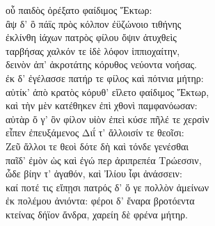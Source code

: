 \begin{Versi}[466]
\ladd{\ldots} οὗ παιδὸς ὀρέξατο φαίδιμος Ἕκτωρ:\\
ἂψ δ' ὃ πάϊς πρὸς κόλπον ἐϋζώνοιο τιθήνης\\
ἐκλίνθη ἰάχων πατρὸς φίλου ὄψιν ἀτυχθεὶς\\
ταρβήσας χαλκόν τε ἰδὲ λόφον ἱππιοχαίτην,\\
δεινὸν ἀπ' ἀκροτάτης κόρυθος νεύοντα νοήσας.\\
ἐκ δ' ἐγέλασσε πατήρ τε φίλος καὶ πότνια μήτηρ:\\
αὐτίκ' ἀπὸ κρατὸς κόρυθ' εἵλετο φαίδιμος Ἕκτωρ,\\
καὶ τὴν μὲν κατέθηκεν ἐπὶ χθονὶ παμφανόωσαν:\\
αὐτὰρ ὅ γ' ὃν φίλον υἱὸν ἐπεὶ κύσε πῆλέ τε χερσὶν\\
εἶπεν ἐπευξάμενος Διΐ τ' ἄλλοισίν τε θεοῖσι:\\
Ζεῦ ἄλλοι τε θεοὶ δότε δὴ καὶ τόνδε γενέσθαι\\
παῖδ' ἐμὸν ὡς καὶ ἐγώ περ ἀριπρεπέα Τρώεσσιν,\\
ὧδε βίην τ' ἀγαθόν, καὶ Ἰλίου ἶφι ἀνάσσειν:\\
καί ποτέ τις εἴπῃσι πατρός δ' ὅ γε πολλὸν ἀμείνων\\
ἐκ πολέμου ἀνιόντα: φέροι δ' ἔναρα βροτόεντα\\
κτείνας δήϊον ἄνδρα, χαρείη δὲ φρένα μήτηρ.\\
\end{Versi}